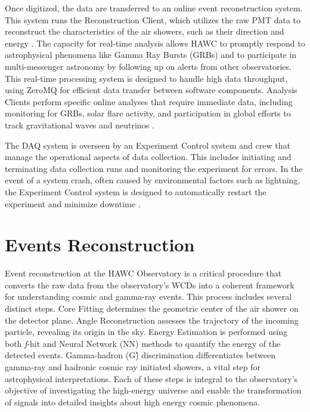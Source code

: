 Once digitized, the data are transferred to an online event reconstruction system.
This system runs the Reconstruction Client, which utilizes the raw PMT data to reconstruct the characteristics of the air showers, such as their direction and energy \cite{HAWC_DAQ_NIM}.
The capacity for real-time analysis allows HAWC to promptly respond to astrophysical phenomena like Gamma Ray Bursts (GRBs) and to participate in multi-messenger astronomy by following up on alerts from other observatories.
This real-time processing system is designed to handle high data throughput, using ZeroMQ \cite{zeromq} for efficient data transfer between software components.
Analysis Clients perform specific online analyses that require immediate data, including monitoring for GRBs, solar flare activity, and participation in global efforts to track gravitational waves and neutrinos \cite{nim:hawc_detect}.

The DAQ system is overseen by an Experiment Control system and crew that manage the operational aspects of data collection.
This includes initiating and terminating data collection runs and monitoring the experiment for errors.
In the event of a system crash, often caused by environmental factors such as lightning, the Experiment Control system is designed to automatically restart the experiment and minimize downtime \cite{nim:hawc_detect,HAWC_DAQ_NIM}.

\section{Events Reconstruction} \label{sec:hawc_reconstruction}

Event reconstruction at the HAWC Observatory is a critical procedure that converts the raw data from the observatory's WCDs into a coherent framework for understanding cosmic and gamma-ray events.
This process includes several distinct steps.
Core Fitting determines the geometric center of the air shower on the detector plane.
Angle Reconstruction assesses the trajectory of the incoming particle, revealing its origin in the sky.
Energy Estimation is performed using both \textit{f}-hit and Neural Network (NN) methods to quantify the energy of the detected events.
Gamma-hadron (G\H) discrimination differentiates between gamma-ray and hadronic cosmic ray initiated showers, a vital step for astrophysical interpretations.
Each of these steps is integral to the observatory's objective of investigating the high-energy universe and enable the transformation of signals into detailed insights about high energy cosmic phenomena.


